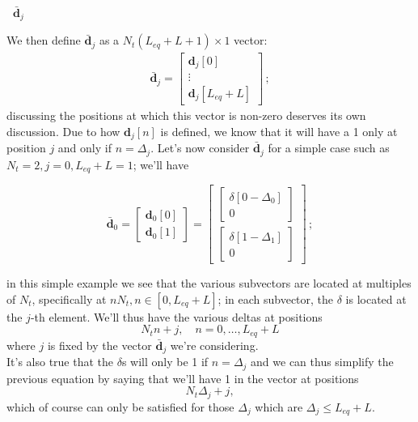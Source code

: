 \documentclass[a4paper, 12pt]{book}
\begin{document}
\begin{tcolorbox}[colback=obsidianBlue, colframe=white, boxrule=0pt, sharp corners]
    \textcolor{obsidianTextBlue}{\textbf{\faPen\ $\bar{\mathbf{d}}_j$}}
    
    We then define $\bar{\mathbf{d}}_j$ as a $N_t(L_{eq}+L+1) \times 1$ vector:
    \begin{align}
        \bar{\mathbf{d}}_j = \begin{bmatrix} \mathbf{d}_j[0] \\ \vdots \\ \mathbf{d}_j[L_{eq}+L] \end{bmatrix} \,; \tag{2.135}
    \end{align}
    discussing the positions at which this vector is non-zero deserves its own discussion. Due to how $\mathbf{d}_j[n]$ is defined, we know that it will have a 1 only at
    position $j$ and only if $n = \Delta_j$. Let's now consider $\bar{\mathbf{d}}_j$ for a simple case such as $N_t=2, j=0, L_{eq}+L=1$; we'll have
    
    \[
    \bar{\mathbf{d}}_0 = \begin{bmatrix} \mathbf{d}_0[0] \\ \mathbf{d}_0[1] \end{bmatrix} = 
    \begin{bmatrix} 
        \begin{bmatrix} \delta[0-\Delta_0] \\ 0 \end{bmatrix} \\ 
        \begin{bmatrix} \delta[1-\Delta_1] \\ 0 \end{bmatrix} 
    \end{bmatrix}
    \,;
    \]

    in this simple example we see that the various subvectors are located at multiples of $N_t$, specifically at $nN_t, n \in [0, L_{eq}+L]$; in each subvector, the $\delta$ is located at the $j$-th element. We'll thus have the various deltas at positions
    \[ N_t n + j, \quad n = 0, \dots, L_{eq} + L \]
    where $j$ is fixed by the vector $\bar{\mathbf{d}}_j$ we're considering.\\
    It's also true that the $\delta$s will only be 1 if $n = \Delta_j$ and we can thus simplify the previous equation by saying that we'll have 1 in the vector at positions
    \[ N_t \Delta_j + j, \]
    which of course can only be satisfied for those $\Delta_j$ which are $\Delta_j \leq L_{eq} + L$.
\end{tcolorbox}
\end{document}
